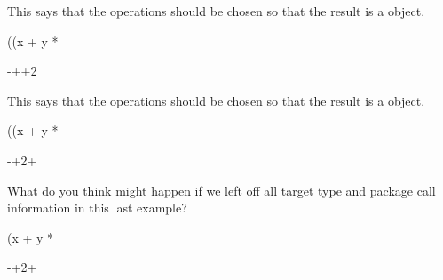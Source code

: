 \begin{xtc}
\begin{xtccomment}
This says that the operations should be chosen so
that the result is a  object.
\end{xtccomment}
\begin{spadsrc}
((x + y * %
\end{spadsrc}
\begin{TeXOutput}
\begin{fricasmath}{5}
-{}++2\TIMES {}\TIMES %
\TIMES \ImaginaryI %
\end{fricasmath}
\end{TeXOutput}
\end{xtc}
\begin{xtc}
\begin{xtccomment}
This says that the operations should be chosen so
that the result is a  object.
\end{xtccomment}
\begin{spadsrc}
((x + y * %
\end{spadsrc}
\begin{TeXOutput}
\begin{fricasmath}{6}
-{}+2\TIMES \ImaginaryI \TIMES {}\TIMES {}+%
\end{fricasmath}
\end{TeXOutput}
\end{xtc}
\begin{xtc}
\begin{xtccomment}
What do you think might happen if we left off all
target type and package call information in this last example?
\end{xtccomment}
\begin{spadsrc}
(x + y * %
\end{spadsrc}
\begin{TeXOutput}
\begin{fricasmath}{7}
-{}+2\TIMES \ImaginaryI \TIMES {}\TIMES {}+%
\end{fricasmath}
\end{TeXOutput}
\end{xtc}

